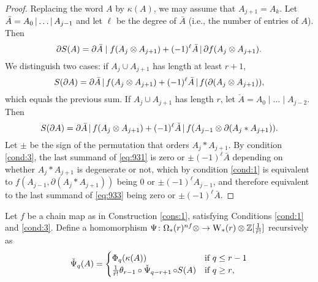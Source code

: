 \begin{proof}
	Replacing the word $A$ by $\kappa(A)$, we may assume that $A_{j+1} = A_k$. Let $\bar{A} = A_0\operatorname{|} \dots\operatorname{|} A_{j-1}$ and let $\ell$ be the degree of $\bar{A}$ (i.e., the number of entries of $A$). Then 
	\begin{equation}\label{eq:931}
		\partial S(A) = \partial \bar{A}\mid f(A_{j} \otimes A_{j+1}) + (-1)^{\ell}\bar{A}\operatorname{|} \partial f(A_{j} \otimes A_{j+1}).
	\end{equation}
	We distinguish two cases: if $A_j\cup A_{j+1}$ has length at least $r+1$,
	\[S(\partial A) = \partial \bar{A}\operatorname{|} f(A_j \otimes A_{j+1}) + (-1)^{\ell}\bar{A}\operatorname{|} f(\partial (A_j \otimes A_{j+1})),\]
	which equals the previous sum. If $A_j\cup A_{j+1}$ has length $r$, let $\check{A} = A_0\mid \dots\mid A_{j-2}$. Then
	\begin{equation}\label{eq:933}
		S(\partial A) = \partial \bar{A}\operatorname{|} f(A_j \otimes A_{j+1}) + (-1)^\ell \check{A}\operatorname{|} f(A_{j-1} \otimes \partial(A_j*A_{j+1})).
	\end{equation}
	Let $\pm$ be the sign of the permutation that orders $A_j*A_{j+1}$. By condition \eqref{cond:3}, the last summand of \eqref{eq:931} is zero or $\pm(-1)^\ell\bar{A}$ depending on whether $A_j*A_{j+1}$ is degenerate or not, which by condition \eqref{cond:1} is equivalent to $f(A_{j-1},\partial(A_j*A_{j+1}))$ being $0$ or $\pm(-1)^{\ell}A_{j-1}$, and therefore equivalent to the last summand of \eqref{eq:933} being zero or $\pm(-1)^{\ell}\bar{A}$.
\end{proof}


\begin{definition}\label{def:psiom}
	Let $f$ be a chain map as in Construction \ref{cons:1}, satisfying Conditions \eqref{cond:1} and \eqref{cond:3}. Define a homomorphism $\Psi \colon \Omega_*(r)^{nf} \otimes \to \operatorname{W}_{*}(r) \otimes \mathbb{Z}[\frac{1}{\tilde{r}!}]$ recursively as
	\[\operatorname{\check{\Psi}}_q(A) = \begin{cases} \Phi_q(\kappa(A)) & \text{if $q\leq r-1$} \\
		\frac{1}{\tilde{r}!}\theta_{r-1}\circ \operatorname{\check{\Psi}}_{q-r+1}\circ S(A) & \text{if $q \geq r$,}\end{cases}\]
\end{definition}

